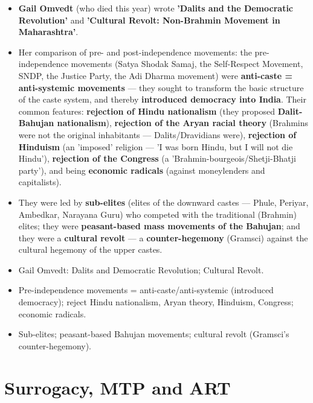 \begin{KeyConcept}
\begin{itemize}
\item \textbf{Gail Omvedt} (who died this year) wrote \textbf{'Dalits and the Democratic Revolution'} and \textbf{'Cultural Revolt: Non-Brahmin Movement in Maharashtra'}.
\item Her comparison of pre- and post-independence movements: the pre-independence movements (Satya Shodak Samaj, the Self-Respect Movement, SNDP, the Justice Party, the Adi Dharma movement) were \textbf{anti-caste = anti-systemic movements} --- they sought to transform the basic structure of the caste system, and thereby \textbf{introduced democracy into India}. Their common features: \textbf{rejection of Hindu nationalism} (they proposed \textbf{Dalit-Bahujan nationalism}), \textbf{rejection of the Aryan racial theory} (Brahmins were not the original inhabitants --- Dalits/Dravidians were), \textbf{rejection of Hinduism} (an 'imposed' religion --- 'I was born Hindu, but I will not die Hindu'), \textbf{rejection of the Congress} (a 'Brahmin-bourgeois/Shetji-Bhatji party'), and being \textbf{economic radicals} (against moneylenders and capitalists).
\item They were led by \textbf{sub-elites} (elites of the downward castes --- Phule, Periyar, Ambedkar, Narayana Guru) who competed with the traditional (Brahmin) elites; they were \textbf{peasant-based mass movements of the Bahujan}; and they were a \textbf{cultural revolt} --- a \textbf{counter-hegemony} (Gramsci) against the cultural hegemony of the upper castes.
\end{itemize}
\end{KeyConcept}

\begin{QuickRevision}
\begin{itemize}
\item Gail Omvedt: Dalits and Democratic Revolution; Cultural Revolt.
\item Pre-independence movements = anti-caste/anti-systemic (introduced democracy); reject Hindu nationalism, Aryan theory, Hinduism, Congress; economic radicals.
\item Sub-elites; peasant-based Bahujan movements; cultural revolt (Gramsci's counter-hegemony).
\end{itemize}
\end{QuickRevision}

\section{Surrogacy, MTP and ART}

